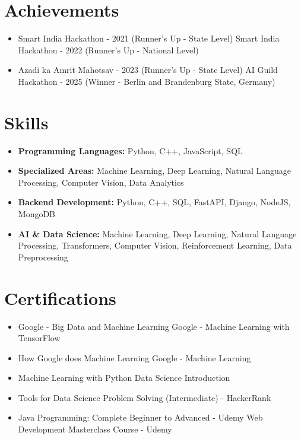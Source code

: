 \documentclass[a4paper,10pt]{article}
\begin{document}
\section*{Achievements}
\begin{itemize}
\item Smart India Hackathon - 2021 (Runner's Up - State Level) \hfill Smart India Hackathon - 2022 (Runner's Up - National Level)
\item Azadi ka Amrit Mahotsav - 2023 (Runner's Up - State Level) \hfill AI Guild Hackathon - 2025 (Winner - Berlin and Brandenburg State, Germany)
\end{itemize}

\section*{Skills}
\begin{itemize}
  \item \textbf{Programming Languages:} Python, C++, JavaScript, SQL
  \item \textbf{Specialized Areas:} Machine Learning, Deep Learning, Natural Language Processing, Computer Vision, Data Analytics
  \item \textbf{Backend Development:} Python, C++, SQL, FastAPI, Django, NodeJS, MongoDB
  \item \textbf{AI \& Data Science:} Machine Learning, Deep Learning, Natural Language Processing, Transformers, Computer Vision, Reinforcement Learning, Data Preprocessing
\end{itemize}

\section*{Certifications}
\begin{itemize}
\item Google - Big Data and Machine Learning \hfill Google - Machine Learning with TensorFlow
\item How Google does Machine Learning \hfill Google - Machine Learning
\item Machine Learning with Python \hfill Data Science Introduction
\item Tools for Data Science \hfill Problem Solving (Intermediate) - HackerRank
\item Java Programming: Complete Beginner to Advanced - Udemy \hfill Web Development Masterclass Course - Udemy
\end{itemize}
\end{document}
